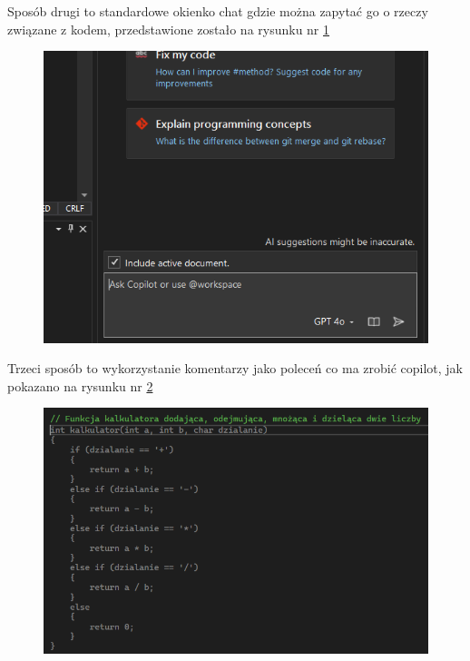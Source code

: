 Sposób drugi to standardowe okienko chat gdzie można zapytać go o rzeczy związane z kodem, przedstawione zostało na rysunku nr \ref{fig:copilotchat}

\begin{figure}[H]
	\centering
	\includegraphics[width=1\linewidth]{images/CopilotChat}
	\caption{}
	\label{fig:copilotchat}
\end{figure}

Trzeci sposób to wykorzystanie komentarzy jako poleceń co ma zrobić copilot, jak pokazano na rysunku nr \ref{fig:copilotcomments}

\begin{figure}[H]
	\centering
	\includegraphics[width=1\linewidth]{images/CopilotComments}
	\caption{}
	\label{fig:copilotcomments}
\end{figure}

